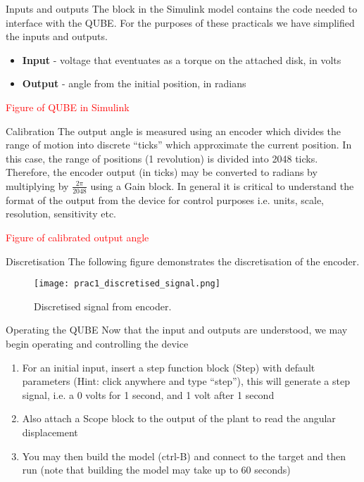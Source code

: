 \documentclass[9pt]{beamer-control}
\begin{document}

\begin{frame}{Inputs and outputs}
The block in the Simulink model contains the code needed to interface with the QUBE. For the purposes of these practicals we have simplified the inputs and outputs. 

\begin{itemize}
	\item \textbf{Input} - voltage that eventuates as a torque on the attached disk, in volts
	\item \textbf{Output} - angle from the initial position, in radians
\end{itemize}

\textcolor{red}{Figure of QUBE in Simulink}


\end{frame}


\begin{frame}{Calibration}
	The output angle is measured using an encoder which divides the range of motion into discrete ``ticks” which approximate the current position. In this case, the range of positions (1 revolution) is divided into 2048 ticks. Therefore, the encoder output (in ticks) may be converted to radians by multiplying by $\tfrac{2\pi}{2048}$ using a Gain block. In general it is critical to understand the format of the output from the device for control purposes i.e. units, scale, resolution, sensitivity etc. 
	
	\textcolor{red}{Figure of calibrated output angle}
\end{frame}

\begin{frame}{Discretisation}
The following figure demonstrates the discretisation of the encoder.
\begin{figure}
\centering
\texttt{[image: prac1\_discretised\_signal.png]}
\caption{Discretised signal from encoder.}
\end{figure}

\end{frame}



\begin{frame}{Operating the QUBE}
	Now that the input and outputs are understood, we may begin operating and controlling the device
	\begin{enumerate}
		\item For an initial input, insert a step function block (Step) with default parameters (Hint: click anywhere and type “step”), this will generate a step signal, i.e. a 0 volts for 1 second, and 1 volt after 1 second
		\item Also attach a Scope block to the output of the plant to read the angular displacement
		\item You may then build the model (ctrl-B) and connect to the target and then run (note that building the model may take up to 60 seconds)
	\end{enumerate}

\end{frame}
\end{document}
